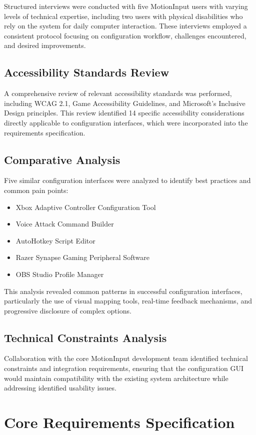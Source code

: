 Structured interviews were conducted with five MotionInput users with varying levels of technical expertise, including two users with physical disabilities who rely on the system for daily computer interaction. These interviews employed a consistent protocol focusing on configuration workflow, challenges encountered, and desired improvements.

\subsection{Accessibility Standards Review}
A comprehensive review of relevant accessibility standards was performed, including WCAG 2.1, Game Accessibility Guidelines, and Microsoft's Inclusive Design principles. This review identified 14 specific accessibility considerations directly applicable to configuration interfaces, which were incorporated into the requirements specification.

\subsection{Comparative Analysis}
Five similar configuration interfaces were analyzed to identify best practices and common pain points:
\begin{itemize}
    \item Xbox Adaptive Controller Configuration Tool
    \item Voice Attack Command Builder
    \item AutoHotkey Script Editor
    \item Razer Synapse Gaming Peripheral Software
    \item OBS Studio Profile Manager
\end{itemize}

This analysis revealed common patterns in successful configuration interfaces, particularly the use of visual mapping tools, real-time feedback mechanisms, and progressive disclosure of complex options.

\subsection{Technical Constraints Analysis}
Collaboration with the core MotionInput development team identified technical constraints and integration requirements, ensuring that the configuration GUI would maintain compatibility with the existing system architecture while addressing identified usability issues.

\section{Core Requirements Specification}

